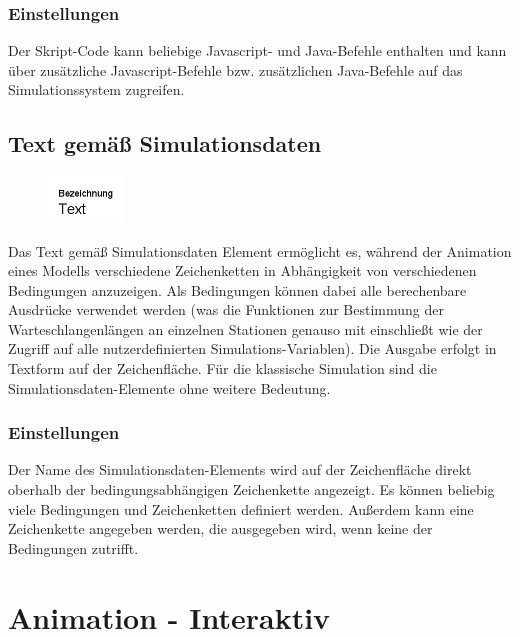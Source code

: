 \subsection*{Einstellungen}

Der Skript-Code kann beliebige Javascript- und Java-Befehle enthalten und kann über
zusätzliche Javascript-Befehle bzw. zusätzlichen Java-Befehle 
auf das Simulationssystem zugreifen.


\section{Text gemäß Simulationsdaten}
\label{ref:ModelElementAnimationTextSelect}

\begin{figure}
\vspace{-22pt}
\includegraphics[width=2cm]{imageModelElementAnimationTextSelect.png}
\vspace{-22pt}
\end{figure}

Das Text gemäß Simulationsdaten Element ermöglicht es, während der Animation eines Modells verschiedene
Zeichenketten in Abhängigkeit von verschiedenen Bedingungen anzuzeigen. Als Bedingungen können dabei
alle berechenbare Ausdrücke verwendet werden (was die Funktionen zur Bestimmung der Warteschlangenlängen
an einzelnen Stationen genauso mit einschließt wie der Zugriff auf alle nutzerdefinierten Simulations-Variablen).
Die Ausgabe erfolgt in Textform auf der Zeichenfläche. Für die klassische Simulation sind die Simulationsdaten-Elemente
ohne weitere Bedeutung.

\subsection*{Einstellungen}

Der Name des Simulationsdaten-Elements wird auf der Zeichenfläche direkt oberhalb der bedingungsabhängigen Zeichenkette angezeigt.
Es können beliebig viele Bedingungen und Zeichenketten definiert werden.
Außerdem kann eine Zeichenkette angegeben werden, die ausgegeben wird, wenn keine der Bedingungen zutrifft.





\chapter{Animation - Interaktiv}

